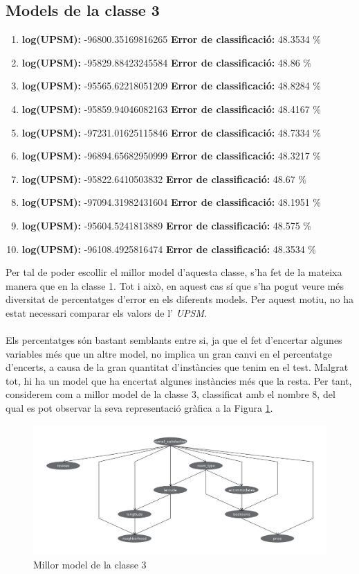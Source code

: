 	\subsection{Models de la classe 3}
	\begin{enumerate}
		\item \textbf{log(UPSM):} -96800.35169816265 \textbf{Error de classificació:} 48.3534 \%
		\item \textbf{log(UPSM):} -95829.88423245584 \textbf{Error de classificació:} 48.86 \%
		\item \textbf{log(UPSM):} -95565.62218051209 \textbf{Error de classificació:} 48.8284 \%
		\item \textbf{log(UPSM):} -95859.94046082163 \textbf{Error de classificació:} 48.4167 \%
		\item \textbf{log(UPSM):} -97231.01625115846 \textbf{Error de classificació:} 48.7334 \%
		\item \textbf{log(UPSM):} -96894.65682950999 \textbf{Error de classificació:} 48.3217 \%
		\item \textbf{log(UPSM):} -95822.6410503832 \textbf{Error de classificació:} 48.67 \%
		\item \textbf{log(UPSM):} -97094.31982431604 \textbf{Error de classificació:} 48.1951 \%
		\item \textbf{log(UPSM):} -95604.5241813889 \textbf{Error de classificació:} 48.575 \%
		\item \textbf{log(UPSM):} -96108.4925816474 \textbf{Error de classificació:} 48.3534 \%
	\end{enumerate}
	\vspace{0.5cm}
	Per tal de poder escollir el millor model d'aquesta classe, s'ha fet de la mateixa manera que en la classe 1. Tot i això, en aquest cas sí que s'ha pogut veure més diversitat de percentatges d'error en els diferents models. Per aquest motiu, no ha estat necessari comparar els valors de l' \textit{UPSM}.\\
	\\
	Els percentatges són bastant semblants entre si, ja que el fet d'encertar algunes variables més que un altre model, no implica un gran canvi en el percentatge d'encerts, a causa de la gran quantitat d'instàncies que tenim en el test. Malgrat tot, hi ha un model que ha encertat algunes instàncies més que la resta. Per tant, considerem com a millor model de la classe 3, classificat amb el nombre 8, del qual es pot observar la seva representació gràfica a la Figura \ref{fig:model3}.
	\begin{figure}[H]
		\centering
		\includegraphics[width=15cm]{imgs/modelclasse3.png}
		\caption{Millor model de la classe 3}
		\label{fig:model3}
	\end{figure}

